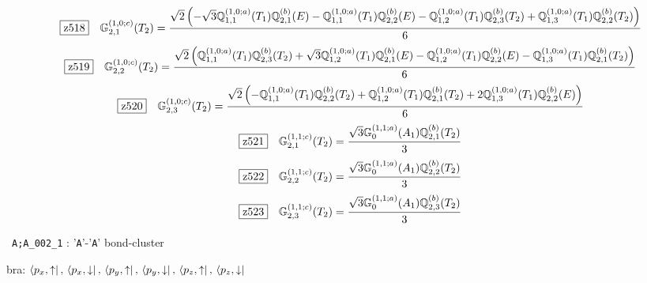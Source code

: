 \documentclass[fleqn,10pt,landscape]{jsarticle}
\begin{document}
\begin{dmath*}
\hspace*{3mm}\fbox{z518}\quad \mathbb{G}_{2,1}^{(1,0;c)}(T_{2})=\frac{\sqrt{2} \left(- \sqrt{3} \mathbb{Q}_{1,1}^{(1,0;a)}(T_{1}) \mathbb{Q}_{2,1}^{(b)}(E) - \mathbb{Q}_{1,1}^{(1,0;a)}(T_{1}) \mathbb{Q}_{2,2}^{(b)}(E) - \mathbb{Q}_{1,2}^{(1,0;a)}(T_{1}) \mathbb{Q}_{2,3}^{(b)}(T_{2}) + \mathbb{Q}_{1,3}^{(1,0;a)}(T_{1}) \mathbb{Q}_{2,2}^{(b)}(T_{2})\right)}{6}
\end{dmath*}
\begin{dmath*}
\hspace*{3mm}\fbox{z519}\quad \mathbb{G}_{2,2}^{(1,0;c)}(T_{2})=\frac{\sqrt{2} \left(\mathbb{Q}_{1,1}^{(1,0;a)}(T_{1}) \mathbb{Q}_{2,3}^{(b)}(T_{2}) + \sqrt{3} \mathbb{Q}_{1,2}^{(1,0;a)}(T_{1}) \mathbb{Q}_{2,1}^{(b)}(E) - \mathbb{Q}_{1,2}^{(1,0;a)}(T_{1}) \mathbb{Q}_{2,2}^{(b)}(E) - \mathbb{Q}_{1,3}^{(1,0;a)}(T_{1}) \mathbb{Q}_{2,1}^{(b)}(T_{2})\right)}{6}
\end{dmath*}
\begin{dmath*}
\hspace*{3mm}\fbox{z520}\quad \mathbb{G}_{2,3}^{(1,0;c)}(T_{2})=\frac{\sqrt{2} \left(- \mathbb{Q}_{1,1}^{(1,0;a)}(T_{1}) \mathbb{Q}_{2,2}^{(b)}(T_{2}) + \mathbb{Q}_{1,2}^{(1,0;a)}(T_{1}) \mathbb{Q}_{2,1}^{(b)}(T_{2}) + 2 \mathbb{Q}_{1,3}^{(1,0;a)}(T_{1}) \mathbb{Q}_{2,2}^{(b)}(E)\right)}{6}
\end{dmath*}
\begin{dmath*}
\hspace*{3mm}\fbox{z521}\quad \mathbb{G}_{2,1}^{(1,1;c)}(T_{2})=\frac{\sqrt{3} \mathbb{G}_{0}^{(1,1;a)}(A_{1}) \mathbb{Q}_{2,1}^{(b)}(T_{2})}{3}
\end{dmath*}
\begin{dmath*}
\hspace*{3mm}\fbox{z522}\quad \mathbb{G}_{2,2}^{(1,1;c)}(T_{2})=\frac{\sqrt{3} \mathbb{G}_{0}^{(1,1;a)}(A_{1}) \mathbb{Q}_{2,2}^{(b)}(T_{2})}{3}
\end{dmath*}
\begin{dmath*}
\hspace*{3mm}\fbox{z523}\quad \mathbb{G}_{2,3}^{(1,1;c)}(T_{2})=\frac{\sqrt{3} \mathbb{G}_{0}^{(1,1;a)}(A_{1}) \mathbb{Q}_{2,3}^{(b)}(T_{2})}{3}
\end{dmath*}
\vspace{5mm}

\noindent\textbullet\, \texttt{A;A_002_1} : '\texttt{A}'-'\texttt{A}' bond-cluster

\noindent\quad * bra: $\bra{p_{x},\uparrow},\, \bra{p_{x},\downarrow},\, \bra{p_{y},\uparrow},\, \bra{p_{y},\downarrow},\, \bra{p_{z},\uparrow},\, \bra{p_{z},\downarrow}$
\end{document}

